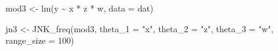 \documentclass[
  letterpaper,
  DIV=11,
  numbers=noendperiod]{scrartcl}
\newenvironment{Shaded}{\begin{snugshade}}{\end{snugshade}}
\newcommand{\AttributeTok}[1]{\textcolor[rgb]{0.40,0.45,0.13}{#1}}
\newcommand{\DecValTok}[1]{\textcolor[rgb]{0.68,0.00,0.00}{#1}}
\newcommand{\FunctionTok}[1]{\textcolor[rgb]{0.28,0.35,0.67}{#1}}
\newcommand{\NormalTok}[1]{\textcolor[rgb]{0.00,0.23,0.31}{#1}}
\newcommand{\OtherTok}[1]{\textcolor[rgb]{0.00,0.23,0.31}{#1}}
\newcommand{\SpecialCharTok}[1]{\textcolor[rgb]{0.37,0.37,0.37}{#1}}
\newcommand{\StringTok}[1]{\textcolor[rgb]{0.13,0.47,0.30}{#1}}
\begin{document}
\begin{Shaded}
\begin{Highlighting}[]
\NormalTok{mod3 }\OtherTok{\textless{}{-}} \FunctionTok{lm}\NormalTok{(y }\SpecialCharTok{\textasciitilde{}}\NormalTok{ x }\SpecialCharTok{*}\NormalTok{ z }\SpecialCharTok{*}\NormalTok{ w, }\AttributeTok{data =}\NormalTok{ dat)}

\NormalTok{jn3 }\OtherTok{\textless{}{-}} \FunctionTok{JNK\_freq}\NormalTok{(mod3,}
                \AttributeTok{theta\_1    =} \StringTok{"x"}\NormalTok{,}
                \AttributeTok{theta\_2    =} \StringTok{"z"}\NormalTok{,}
                \AttributeTok{theta\_3    =} \StringTok{"w"}\NormalTok{,}
                \AttributeTok{range\_size =} \DecValTok{100}\NormalTok{)}
\end{Highlighting}
\end{Shaded}
\end{document}
